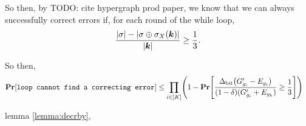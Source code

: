 So then, by TODO: cite hypergraph prod paper, we know that we can always successfully
correct errors if, for each round of the while loop,
$$
	\frac{|\sigma| - |\sigma \oplus \sigma_X(\boldsymbol{\boldsymbol{k}})|}{|\boldsymbol{\boldsymbol{k}}|}	\geq \frac{1}{3}.
$$

\newcommand{\OptVarRV}{Q}
\newcommand{\OptVarEq}{
\frac
			{\NTS \mleft(\genscoreRVCorrected_{g_i} - \lyingGenerator_{g_i}\mright)}
			{(1 - \delta)(\genscoreRVCorrected_{g_i} + \lyingGenerator_{g_k})}
			\geq \frac{1}{3}
}
So then, \begin{align*}
	\Pr\mleft[\texttt{loop cannot find a correcting error}\mright] &\leq
		\prod_{i \in [K]} \mleft(1 - \Pr\mleft[\OptVarEq\mright]\mright)
\end{align*}



 lemma \ref{lemma:decrby}, 


